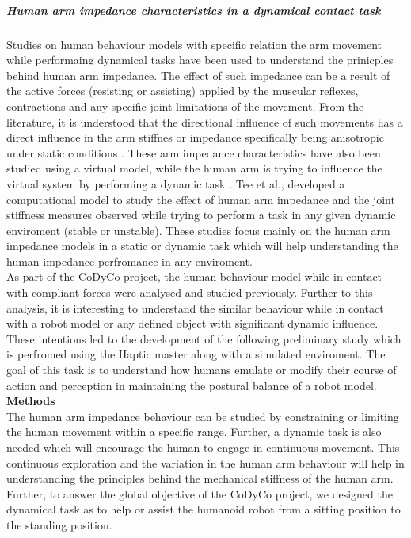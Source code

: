 \subparagraph*{Human arm impedance characteristics in a dynamical contact task}
Studies on human behaviour models with specific relation the arm movement while performaing dynamical tasks have been used to understand the prinicples behind human arm impedance\cite{Darainy, Mussa-Ivaldi}. The effect of such impedance can be a result of the active forces (resisting or assisting) applied by the muscular reflexes, contractions and any specific joint limitations of the movement. From the literature, it is understood that the directional influence of such movements has a direct influence in the arm stiffnes or impedance specifically being anisotropic under static conditions \cite{Burdet2001}. These arm impedance characteristics have also been studied using a virtual model, while the human arm is trying to influence the virtual system by performing a dynamic task \cite{Tsuji2004}. Tee et al.,\cite{tee2004} developed a computational model to study the effect of human arm impedance and the joint stiffness measures observed while trying to perform a task in any given dynamic enviroment (stable or unstable). These studies focus mainly on the human arm impedance models in a static or dynamic task which will help understanding the human impedance perfromance in any enviroment. \\

As part of the CoDyCo project, the human behaviour model while in contact with compliant forces were analysed and studied previously. Further to this analysis, it is interesting to understand the similar behaviour while in contact with a robot model or any defined object with significant dynamic influence. These intentions led to the development of the following preliminary study which is perfromed using the Haptic master along with a simulated enviroment. The goal of this task is to understand how humans emulate or modify their course of action and perception in maintaining the postural balance of a robot model.  \\

\textbf{Methods}\\
The human arm impedance behaviour can be studied by constraining or limiting the human movement within a specific range. Further, a dynamic task is also needed which will encourage the human to engage in continuous movement. This continuous exploration and the variation in the human arm behaviour will help in understanding the principles behind the mechanical stiffness of the human arm. Further, to answer the global objective of the CoDyCo project, we designed the dynamical task as to help or assist the humanoid robot from a sitting position to the standing position. 

